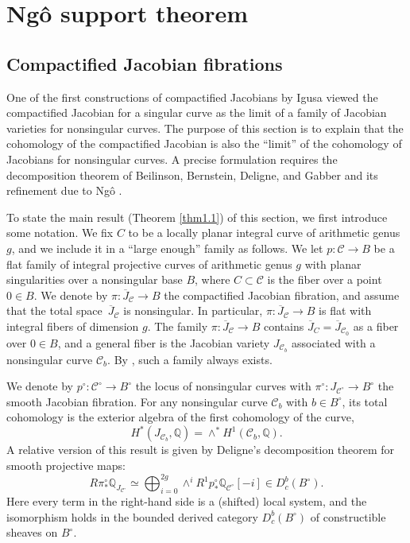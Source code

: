 \documentclass{pspum-l}
\theoremstyle{plain}
\theoremstyle{definition}
\theoremstyle{remark}
\newcommand{\BQ}{{\mathbb{Q}}}
\newcommand{\CC}{{\mathcal C}}
\begin{document}
\section{Ng\^o support theorem}\label{sec1}


\subsection{Compactified Jacobian fibrations}\label{sec1.1}
One of the first constructions of compactified Jacobians by Igusa \cite{Igusa} viewed the compactified Jacobian for a singular curve as the limit of a family of Jacobian varieties for nonsingular curves. The purpose of this section is to explain that the cohomology of the compactified Jacobian is also the ``limit'' of the cohomology of Jacobians for nonsingular curves. A precise formulation requires the decomposition theorem of Beilinson, Bernstein, Deligne, and Gabber \cite{BBDG} and its refinement due to Ng\^o \cite{Ngo}. 

To state the main result (Theorem \ref{thm1.1}) of this section, we first introduce some notation. We fix $C$ to be a locally planar integral curve of arithmetic genus $g$, and we include it in a ``large enough'' family as follows. We let $p: \CC \to B$ be a flat family of integral projective curves of arithmetic genus $g$ with planar singularities over a nonsingular base $B$, where $C \subset \CC$ is the fiber over a point $0\in B$. We denote by $\pi: \overline{J}_\CC \to B$ the compactified Jacobian fibration, and assume that the total space~$\overline{J}_\CC$ is nonsingular. In particular, $\pi: \overline{J}_\CC \to B$ is flat with integral fibers of dimension $g$. The family $\pi: \overline{J}_{\CC} \to B$ contains $\overline{J}_C = \overline{J}_{\CC_0}$ as a fiber over $0\in B$, and a general fiber is the Jacobian variety $J_{\CC_b}$ associated with a nonsingular curve $\CC_b$. By \cite[Proposition 3.5]{MY}, such a family always exists.

We denote by $p^\circ: \CC^\circ \to B^\circ$ the locus of nonsingular curves with $\pi^\circ: J_{\CC^\circ} \to B^\circ$ the smooth Jacobian fibration. For any nonsingular curve $\CC_b$ with $b \in B^\circ$, its total cohomology is the exterior algebra of the first cohomology of the curve,
\[
H^*(J_{\CC_b}, \BQ) = \wedge^* H^1(\CC_b, \BQ).
\]
A relative version of this result is given by Deligne's decomposition theorem for smooth projective maps:
\begin{equation}\label{DT_smooth}
R\pi^\circ_* \BQ_{J_{\CC^\circ}} \simeq \bigoplus_{i=0}^{2g} \wedge^i R^1p^\circ_* \BQ_{{\CC^\circ}} [-i] \in D^b_c(B^\circ).
\end{equation}
Here every term in the right-hand side is a (shifted) local system, and the isomorphism holds in the bounded derived category $D^b_c(B^\circ)$ of constructible sheaves on $B^\circ$.
\end{document}
